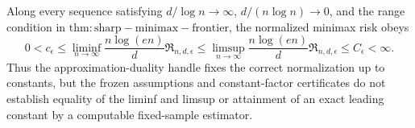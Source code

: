 Along every sequence satisfying \(d/\log n\to\infty\), \(d/(n\log n)\to0\), and the range condition in \(\mathrm{thm:sharp-minimax-frontier}\), the normalized minimax risk obeys
\[
 0<c_\epsilon
 \le\liminf_{n\to\infty}
  \frac{n\log(en)}d\mathfrak R_{n,d,\epsilon}
 \le\limsup_{n\to\infty}
  \frac{n\log(en)}d\mathfrak R_{n,d,\epsilon}
 \le C_\epsilon<\infty.
\]
Thus the approximation-duality handle fixes the correct normalization up to constants, but the frozen assumptions and constant-factor certificates do not establish equality of the liminf and limsup or attainment of an exact leading constant by a computable fixed-sample estimator.